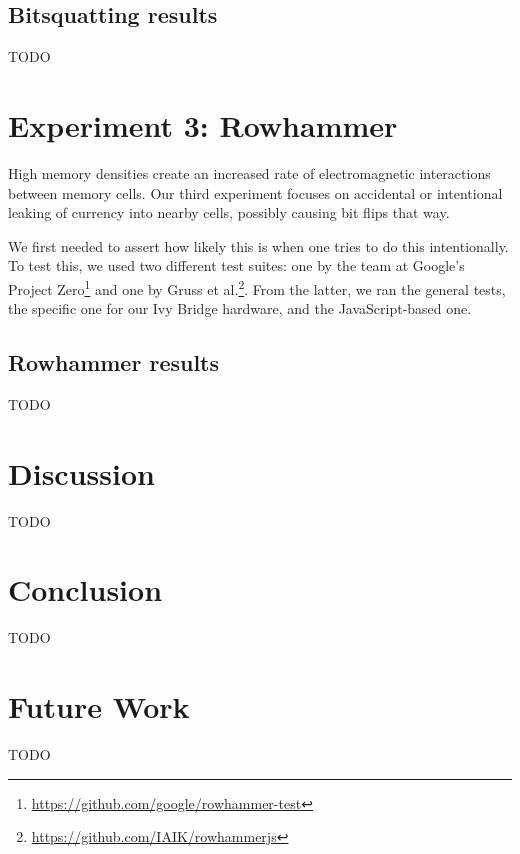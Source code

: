 \documentclass[conference]{IEEEtran}
\begin{document}
\subsection{Bitsquatting results}

TODO


\section{Experiment 3: Rowhammer}

High memory densities create an increased rate of electromagnetic interactions
between memory cells\cite{kim2014flipping}. Our third experiment focuses on
accidental or intentional leaking of currency into nearby cells, possibly
causing bit flips that way.

We first needed to assert how likely this is when one tries to do this
intentionally. To test this, we used two different test suites: one by the team
at Google's Project Zero\footnote{\url{https://github.com/google/rowhammer-test}}
and one by Gruss et al.\cite{gruss2016rowhammer}\footnote{\url{https://github.com/IAIK/rowhammerjs}}.
From the latter, we ran the general tests, the specific one for our Ivy Bridge
hardware, and the JavaScript-based one.


\subsection{Rowhammer results}\label{sec:results}

TODO


\section{Discussion}\label{sec:disc}

TODO


\section{Conclusion}\label{sec:conc}

TODO


\section{Future Work}\label{sec:futwork}

TODO


\printbibliography
\end{document}
